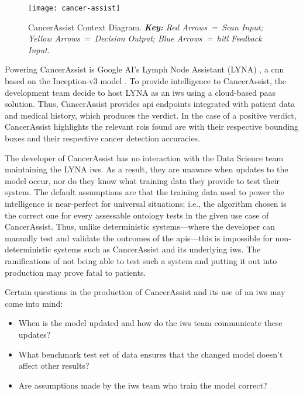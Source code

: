 \begin{figure}[th]
\centering
  \texttt{[image: cancer-assist]}
  \caption[CancerAssist Context Diagram]{CancerAssist Context Diagram. \textit{\textbf{Key:} Red Arrows~=~Scan Input; Yellow Arrows~=~Decision Output; Blue Arrows~=~\gls{hitl} Feedback Input.}}
  \label{fig:introduction:motivation:scenario:cancer}
\end{figure}

Powering CancerAssist is Google AI's Lymph Node Assistant (LYNA) \citep{Liu:2018fa}, a \gls{cnn} based on the Inception-v3 model \citep{Szegedy:2016ws,Krizhevsky:2012wl}. To provide intelligence to CancerAssist, the development team decide to host LYNA as an \gls{iws} using a cloud-based \gls{paas} solution. Thus, CancerAssist provides \gls{api} endpoints integrated with patient data and medical history, which produces the verdict. In the case of a positive verdict, CancerAssist highlights the relevant \glspl{roi} found are with their respective bounding boxes and their respective cancer detection accuracies.

The developer of CancerAssist has no interaction with the Data Science team maintaining the LYNA \gls{iws}. As a result, they are unaware when updates to the model occur, nor do they know what training data they provide to test their system. The default assumptions are that the training data used to power the intelligence is near-perfect for universal situations; i.e., the algorithm chosen is the correct one for every assessable ontology tests in the given use case of CancerAssist. Thus, unlike deterministic systems---where the developer can manually test and validate the outcomes of the \glspl{api}---this is impossible for non-deterministic systems such as CancerAssist and its underlying \gls{iws}. The ramifications of not being able to test such a system and putting it out into production may prove fatal to patients.

Certain questions in the production of CancerAssist and its use of an \gls{iws} may come into mind:

\begin{itemize}%
  \item When is the model updated and how do the \gls{iws} team communicate these updates?
  \item What benchmark test set of data ensures that the changed model doesn't affect other results?
  \item Are assumptions made by the \gls{iws} team who train the model correct?
\end{itemize}

